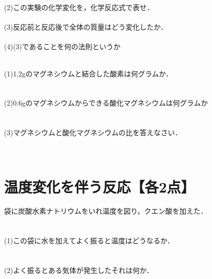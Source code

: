 \documentclass[autodetect-engine,dvi=dvipdfmx,ja=standard,
               a4j,11pt]{bxjsarticle}
\begin{document}
    (2)この実験の化学変化を，化学反応式で表せ．\\\\

    (3)反応前と反応後で全体の質量はどう変化したか．\\\\

    (4)(3)であることを何の法則というか\\\\
\clearpage

  \begin{figure}[htb]
        \centering
        \vspace{20pt} %
        \caption{}
\end{figure}  
 (1)1.2gのマグネシウムと結合した酸素は何グラムか．\\\\\\

 (2)0.6gのマグネシウムからできる酸化マグネシウムは何グラムか\\\\\\

 (3)マグネシウムと酸化マグネシウムの比を答えなさい．   \\\\\\

 \section{温度変化を伴う反応【各2点】}
 袋に炭酸水素ナトリウムをいれ温度を図り，クエン酸を加えた．\\\\\\
 
 (1)この袋に水を加えてよく振ると温度はどうなるか．\\\\\\

 (2)よく振るとある気体が発生したそれは何か．\\\\\\
\end{document}
